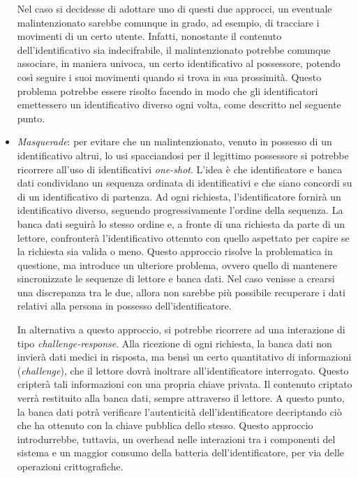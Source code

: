 \documentclass[a4paper,12pt]{report}
\begin{document}
\begin{itemize}
	Nel caso si decidesse di adottare uno di questi due approcci, un eventuale malintenzionato sarebbe comunque in grado, ad esempio, di tracciare i movimenti di un certo utente. Infatti, nonostante il contenuto dell'identificativo sia indecifrabile, il malintenzionato potrebbe comunque associare, in maniera univoca, un certo identificativo al possessore, potendo così seguire i suoi movimenti quando si trova in sua prossimità. Questo problema potrebbe essere risolto facendo in modo che gli identificatori emettessero un identificativo diverso ogni volta, come descritto nel seguente punto. 
	\item \emph{Masquerade}: per evitare che un malintenzionato, venuto in possesso di un identificativo altrui, lo usi spacciandosi per il legittimo possessore si potrebbe ricorrere all'uso di identificativi \emph{one-shot}. L'idea è che identificatore e banca dati condividano un sequenza ordinata di identificativi e che siano concordi su di un identificativo di partenza. Ad ogni richiesta, l'identificatore fornirà un identificativo diverso, seguendo progressivamente l'ordine della sequenza. La banca dati seguirà lo stesso ordine e, a fronte di una richiesta da parte di un lettore, confronterà l'identificativo ottenuto con quello aspettato per capire se la richiesta sia valida o meno. Questo approccio risolve la problematica in questione, ma introduce un ulteriore problema, ovvero quello di mantenere sincronizzate le sequenze di lettore e banca dati. Nel caso venisse a crearsi una discrepanza tra le due, allora non sarebbe più possibile recuperare i dati relativi alla persona in possesso dell'identificatore.
	
	In alternativa a questo approccio, si potrebbe ricorrere ad una interazione di tipo \emph{challenge-response}. Alla ricezione di ogni richiesta, la banca dati non invierà dati medici in risposta, ma bensì un certo quantitativo di informazioni (\emph{challenge}), che il lettore dovrà inoltrare all'identificatore interrogato. Questo cripterà tali informazioni con una propria chiave privata. Il contenuto criptato verrà restituito alla banca dati, sempre attraverso il lettore. A questo punto, la banca dati potrà verificare l'autenticità dell'identificatore decriptando ciò che ha ottenuto con la chiave pubblica dello stesso. Questo approccio introdurrebbe, tuttavia, un overhead nelle interazioni tra i componenti del sistema e un maggior consumo della batteria dell'identificatore, per via delle operazioni crittografiche.
	

\end{itemize}
\end{document}
